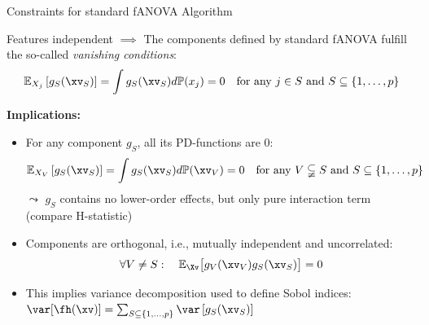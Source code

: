 \documentclass[11pt,compress,t,notes=noshow, aspectratio=169, xcolor=table]{beamer}
\begin{document}
\begin{frame}{Constraints for standard fANOVA Algorithm}

    \begin{theorem}
    
        Features independent $\implies$ The components defined by standard fANOVA fulfill the so-called \textit{vanishing conditions}:
        \begin{align*}
            \mathbb{E}_{X_j}\left[ g_{S}(\xv_S) \right]
            = \int g_{S}(\xv_S) d \mathbb{P}(x_j) = 0 \quad \text{for any } j \in S \text{ and } S \subseteq \{1, \ldots, p\}
        \end{align*}
    \end{theorem}


    
    \pause 
    \textbf{Implications:}
    \begin{itemize}
        \item 
        For any component $g_{S}$, all its PD-functions are 0:
        $$
        \mathbb{E}_{X_V}\left[ g_{S}(\xv_S) \right]
        = \int g_{S}(\xv_S) d \mathbb{P}(\xv_V) = 0 \quad \text{for any } V \subsetneqq S \text{ and } S \subseteq \{1, \ldots, p\}
        $$
        $\leadsto$ $g_{S}$ contains no lower-order effects, but only pure interaction term \\
        (compare H-statistic)
        \pause
        \item Components are orthogonal, i.e., mutually independent and uncorrelated:
        $$
        \forall V \neq S: \quad \mathbb{E}_{\Xv} \bigl[ g_{V}(\xv_V) g_{S}(\xv_S) \bigr] = 0
        $$
        \item This implies variance decomposition used to define Sobol indices:
    $ \var[ \fh(\xv) ] =  \textstyle\sum_{S \subseteq \{1,\ldots,p\}}  \var \left[ g_{S}(\xv_S) \right]$
    \end{itemize}
    
\end{frame}
\end{document}

